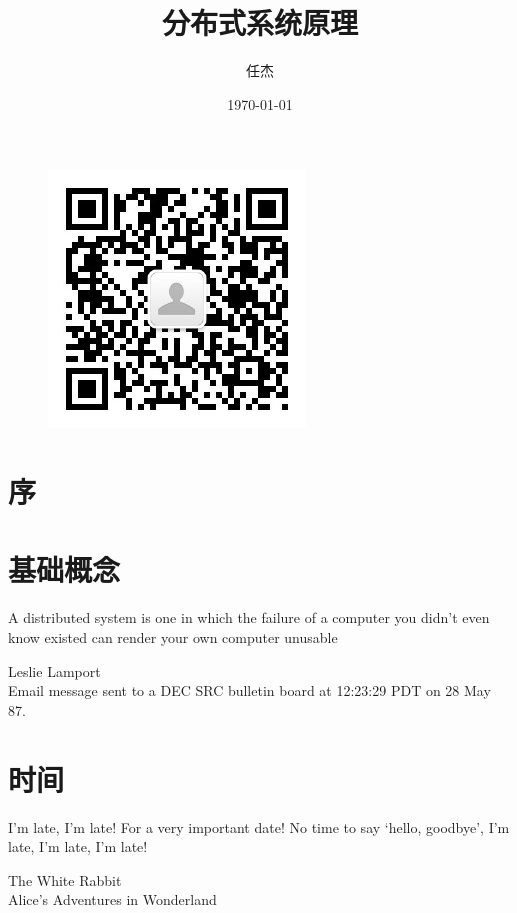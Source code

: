 \documentclass[reqno,heading=true,fontset=macnew]{ctexbook}
\begin{document}
\title{分布式系统原理}
\author{任杰}
\date{\today}

\maketitle

\begin{figure}[H]
\begin{center}
    \includegraphics{images/qrcode}
\end{center}
\end{figure}

\tableofcontents


\chapter*{序}







\chapter{基础概念}

\epigraph{A distributed system is one in which the failure of a computer you didn't even know existed can render your own computer unusable}{Leslie Lamport \\ Email message sent to a DEC SRC bulletin board at 12:23:29 PDT on 28 May 87.}





\chapter{时间}

\epigraph{I’m late, I’m late! For a very important date! No time to say ‘hello, goodbye’, I’m late, I’m late, I’m late!}{The White Rabbit \\ Alice's Adventures in Wonderland}
\end{document}
